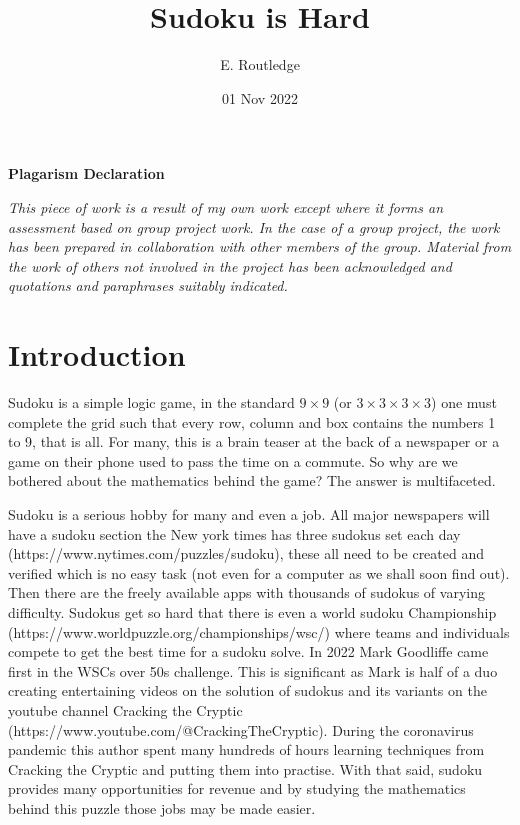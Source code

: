 \documentclass[a4paper,11pt]{report}
\author{E. Routledge}
\date{01 Nov 2022}
\title{Sudoku is Hard}
\newcounter{row}
\newcounter{col}
\begin{document}
\lstset{language=Python}

\begin{center}{\huge\textbf{Plagarism Declaration}}\end{center}
\textit{This piece of work is a result of my own work except where it forms an assessment based on group project work. In the case of a group project, the work has been prepared in collaboration with other members of the group. Material from the work of others not involved in the project has been acknowledged and quotations and paraphrases suitably indicated.}
\begin{abstract}
\end{abstract}
\tableofcontents
\chapter{Introduction}

Sudoku is a simple logic game, in the standard $9 \times 9$ (or $3 \times 3 \times 3 \times 3$) one must complete the grid such that every row, column and box contains the numbers 1 to 9, that is all. For many, this is a brain teaser at the back of a newspaper or a game on their phone used to pass the time on a commute. So why are we bothered about the mathematics behind the game? The answer is multifaceted. 

Sudoku is a serious hobby for many and even a job. All major newspapers will have a sudoku section the New york times has three sudokus set each day (https://www.nytimes.com/puzzles/sudoku), these all need to be created and verified which is no easy task (not even for a computer as we shall soon find out). Then there are the freely available apps with thousands of sudokus of varying difficulty. Sudokus get so hard that there is even a world sudoku Championship (https://www.worldpuzzle.org/championships/wsc/) where teams and individuals compete to get the best time for a sudoku solve. In 2022 Mark Goodliffe came first in the WSCs over 50s challenge. This is significant as Mark is half of a duo creating entertaining videos on the solution of sudokus and its variants on the youtube channel Cracking the Cryptic (https://www.youtube.com/@CrackingTheCryptic). During the coronavirus pandemic this author spent many hundreds of hours learning techniques from Cracking the Cryptic and putting them into practise. With that said, sudoku provides many opportunities for revenue and by studying the mathematics behind this puzzle those jobs may be made easier.
\end{document}

